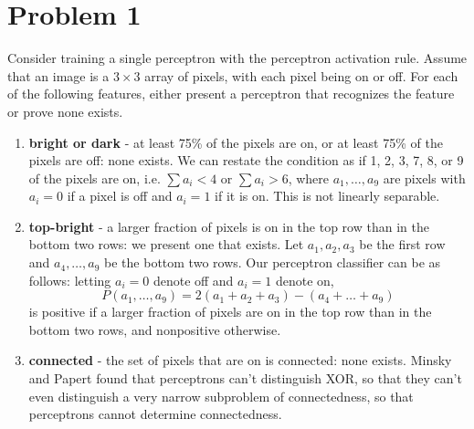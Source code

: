 \documentclass{article}
\begin{document}
\section*{Problem 1}

Consider training a single perceptron with the perceptron activation rule.
Assume that an image is a $3\times 3$ array of pixels, with each pixel 
being on or off. For each of the following features, either present a 
perceptron that recognizes the feature or prove none exists.
\begin{enumerate}
\item \textbf{bright or dark} - at least 75\% of the pixels are on, or 
at least 75\% of the pixels are off: none exists.
We can restate the condition as if 1, 2, 3, 7, 8, or 9 of the pixels are on,
i.e. $\sum a_i<4$ or $\sum a_i>6$, where $a_1,\ldots,a_9$ are pixels with $a_i=0$ if a pixel
is off and $a_i=1$ if it is on. This is not linearly separable. 

\item \textbf{top-bright} - a larger fraction of pixels is on in the top
row than in the bottom two rows: we present one that exists. 
Let $a_1,a_2,a_3$ be the first row and
$a_4,\ldots,a_9$ be the bottom two rows. Our perceptron classifier can
be as follows: letting $a_i=0$ denote off and $a_i=1$ denote on, 
$$P(a_1,\ldots,a_9)=2(a_1+a_2+a_3)-(a_4+\ldots+a_9)$$
is positive if a larger fraction of pixels are on in the top row than
in the bottom two rows, and nonpositive otherwise. 

\item \textbf{connected} - the set of pixels that are on is connected: 
none exists. Minsky and Papert found that perceptrons can't distinguish
XOR, so that they can't even distinguish a very narrow subproblem of
connectedness, so that perceptrons cannot determine connectedness. 
\end{enumerate}
\end{document}
